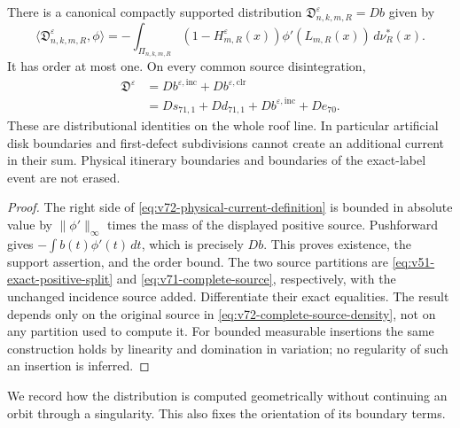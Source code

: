 \begin{theorem}
\label{thm:v72-complete-current}
There is a canonical compactly supported distribution
$\mathfrak D^\varepsilon_{n,k,m,R}=Db$ given by
\begin{equation}\label{eq:v72-physical-current-definition}
 \langle\mathfrak D^\varepsilon_{n,k,m,R},\phi\rangle
 =-\int_{\Pi_{n,k,m,R}}(1-H_{m,R}^\varepsilon(x))
                    \phi'(L_{m,R}(x))\,d\nu_R^*(x).
\end{equation}
It has order at most one. On every common source disintegration,
\begin{equation}\label{eq:v72-current-partition}
 \begin{split}
 \mathfrak D^\varepsilon
 &=D b^{\varepsilon,\mathrm{inc}}
       +D b^{\varepsilon,\mathrm{clr}}\\
 &=D s_{71,1}+D d_{71,1}
       +D b^{\varepsilon,\mathrm{inc}}+D e_{70}.
 \end{split}
\end{equation}
These are distributional identities on the whole roof line. In
particular artificial disk boundaries and first-defect subdivisions
cannot create an additional current in their sum. Physical itinerary
boundaries and boundaries of the exact-label event are not erased.
\end{theorem}
\begin{proof}
The right side of \eqref{eq:v72-physical-current-definition} is
bounded in absolute value by $\|\phi'\|_\infty$ times the mass
of the displayed positive source. Pushforward gives
$-\int b(t)\phi'(t)\,dt$, which is precisely $Db$. This proves
existence, the support assertion, and the order bound. The two source
partitions are \eqref{eq:v51-exact-positive-split} and
\eqref{eq:v71-complete-source}, respectively, with the unchanged
incidence source added. Differentiate their exact equalities. The
result depends only on the original source in
\eqref{eq:v72-complete-source-density}, not on any partition used
to compute it. For bounded measurable insertions the same construction
holds by linearity and domination in variation; no regularity of
such an insertion is inferred.
\end{proof}

We record how the distribution is computed geometrically without
continuing an orbit through a singularity. This also fixes the
orientation of its boundary terms.

